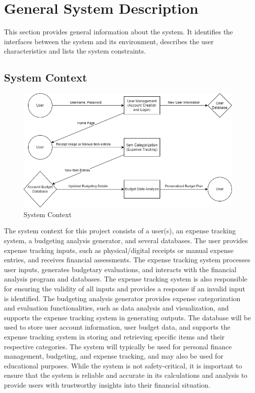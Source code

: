 \documentclass[12pt]{article}
\begin{document}
\newpage

\section{General System Description}

This section provides general information about the system.  It identifies the
interfaces between the system and its environment, describes the user
characteristics and lists the system constraints.

\subsection{System Context}

\begin{figure}[h!]
  \centering
   \includegraphics[width=\textwidth]{SystemContext.png}
  \caption{System Context}
  \label{Fig_SystemContext} 
\end{figure}

The system context for this project consists of a user(s), an expense tracking system, 
a budgeting analysis generator, and several databases. The user provides expense 
tracking inputs, such as physical/digital receipts or manual expense entries, and 
receives financial assessments. The expense tracking system processes user inputs, 
generates budgetary evaluations, and interacts with the financial analysis program 
and databases. The expense tracking system is also responsible for ensuring the 
validity of all inputs and provides a response if an invalid input is identified. 
The budgeting analysis generator provides expense categorization and evaluation 
functionalities, such as data analysis and visualization, and supports the expense 
tracking system in generating outputs. The database will be used to store user 
account information, user budget data, and supports the expense tracking system 
in storing and retrieving specific items and their respective categories. 
The system will typically be used for personal finance management, budgeting, 
and expense tracking, and may also be used for educational purposes. While 
the system is not safety-critical, it is important to ensure that the system is 
reliable and accurate in its calculations and analysis to provide users with 
trustworthy insights into their financial situation.
\end{document}
